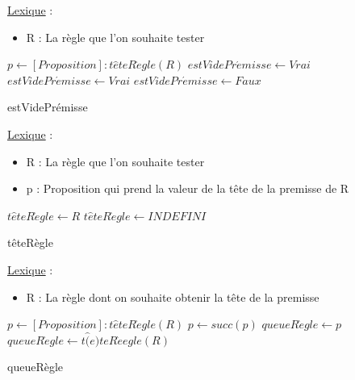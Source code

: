 \documentclass{article}
\begin{document}
\underline{Lexique} :
\begin{itemize}
    \item R : La règle que l'on souhaite tester
\end{itemize}

\clearpage
\begin{algorithm}
    \SetAlgoLined
    \KwResult{[booléen]}
    
    \begin{algorithmic}
        \STATE $p \gets [Proposition] : t\hat{e}teR\grave{e}gle(R)$
            \STATE $estVidePr\acute{e}misse \gets Vrai$
        \ELSE
                \STATE $estVidePr\acute{e}misse \gets Vrai$
            \ELSE
                \STATE $estVidePr\acute{e}misse \gets Faux$
            \ENDIF
        \ENDIF
      
    \end{algorithmic}
    \caption{estVidePrémisse} 
\end{algorithm}

\underline{Lexique} :
\begin{itemize}
    \item R : La règle que l'on souhaite tester
    \item p : Proposition qui prend la valeur de la tête de la premisse de R
\end{itemize}

\begin{algorithm}
    \SetAlgoLined
    \KwResult{[Proposition]}
    
    \begin{algorithmic}
            \STATE $t\hat{e}teR\grave{e}gle \gets R$
        \ELSE
            \STATE $t\hat{e}teR\grave{e}gle \gets INDEFINI$
        \ENDIF
      
    \end{algorithmic}
    \caption{têteRègle} 
\end{algorithm}

\underline{Lexique} :
\begin{itemize}
    \item R : La règle dont on souhaite obtenir la tête de la premisse
\end{itemize}

\begin{algorithm}
    \SetAlgoLined
    \KwResult{[Proposition]}
    
    \begin{algorithmic}
        \STATE $p \gets [Proposition] : t\hat{e}teR\grave{e}gle(R)$
                \STATE $p \gets succ(p)$
            \ENDWHILE
            \STATE $queueR\grave{e}gle \gets p$
        \ELSE
            \STATE $queueR\grave{e}gle \gets t\hat(e)teR\grave{e}egle(R)$
        \ENDIF
      
    \end{algorithmic}
    \caption{queueRègle} 
\end{algorithm}
\end{document}
